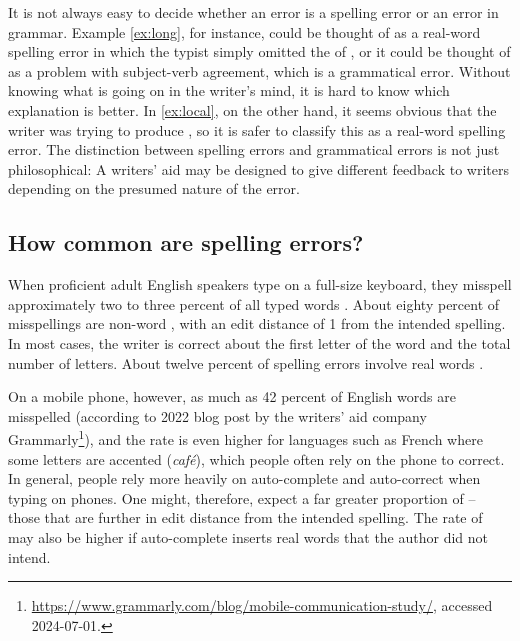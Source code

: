 It is not always easy to decide whether an error is a spelling error
or an error in grammar.
Example \ref{ex:long}, for instance, 
could be thought of as a real-word spelling error in which the typist
simply omitted the  of , or it could be thought
of as a
problem with subject-verb agreement, which is  a
grammatical error.
Without knowing what is going on in the writer's mind,
it is hard 
to know which explanation is better.
In \ref{ex:local}, on the other hand, it seems obvious that the
writer was trying to produce , so it is safer
to classify this as a real-word spelling error.   The distinction between spelling errors and grammatical errors is not just philosophical: A writers' aid may be designed to give different feedback to writers depending on the presumed nature of the error.

\subsection{How common are spelling errors?}

When proficient adult English speakers type on a full-size keyboard, they misspell approximately two to three percent of all typed words \citep{Flor-etal:2015}. 
About eighty percent of misspellings are non-word , with an edit distance of 1 from the intended spelling.  In most cases, the writer is correct about the first letter of the word and the total number of letters. About twelve percent of spelling errors involve real words \citep{Flor-etal:2015}.


On a mobile phone, however, as much as 42 percent of English words are misspelled (according to 2022 blog post by the writers' aid company Grammarly\footnote{\url{https://www.grammarly.com/blog/mobile-communication-study/}, accessed 2024-07-01.}), and the rate is even higher for languages such as French where some letters are accented (\textit{caf\'e}), which people often rely on the phone to correct.  In general, people rely more heavily on auto-complete and auto-correct when typing on phones.
One might, therefore, expect a far greater proportion of  -- those that are further in edit distance from the intended spelling.  The rate of  may also be higher if auto-complete inserts real words that the author did not intend.


